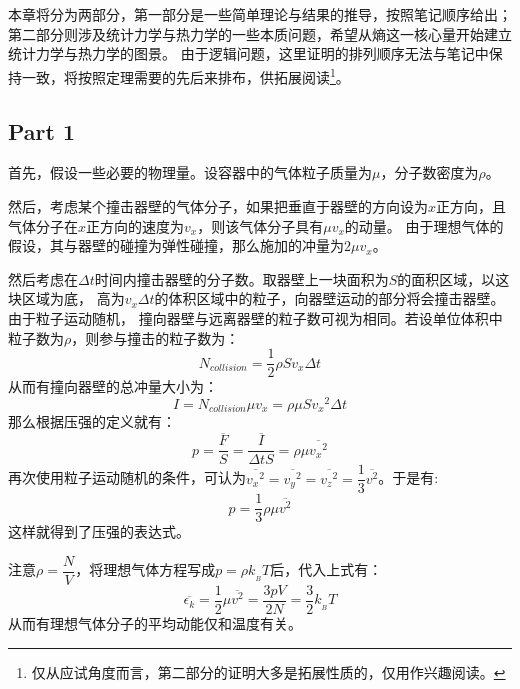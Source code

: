 \chapter[热力学]{}
本章将分为两部分，第一部分是一些简单理论与结果的推导，按照笔记顺序给出；
第二部分则涉及统计力学与热力学的一些本质问题，希望从熵这一核心量开始建立统计力学与热力学的图景。
由于逻辑问题，这里证明的排列顺序无法与笔记中保持一致，将按照定理需要的先后来排布，供拓展阅读\footnote{仅从应试角度而言，第二部分的证明大多是拓展性质的，仅用作兴趣阅读。}。
\section{Part 1}
\begin{prove}
    首先，假设一些必要的物理量。设容器中的气体粒子质量为$\mu$，分子数密度为$\rho$。

    然后，考虑某个撞击器壁的气体分子，如果把垂直于器壁的方向设为$x$正方向，且气体分子在$x$正方向的速度为$v_x$，则该气体分子具有$\mu v_x$的动量。
    由于理想气体的假设，其与器壁的碰撞为弹性碰撞，那么施加的冲量为$2\mu v_x$。

    然后考虑在$\Delta t$时间内撞击器壁的分子数。取器壁上一块面积为$S$的面积区域，以这块区域为底，
    高为$v_x \Delta t$的体积区域中的粒子，向器壁运动的部分将会撞击器壁。由于粒子运动随机，
    撞向器壁与远离器壁的粒子数可视为相同。若设单位体积中粒子数为$\rho$，则参与撞击的粒子数为：
    \begin{equation*}
        N_{collision} = \frac{1}{2} \rho S v_x \Delta t
    \end{equation*}
    从而有撞向器壁的总冲量大小为：
    \begin{equation}
        I = N_{collision} \mu v_x = \rho \mu S v_{x}{}^{2} \Delta t
        \nonumber
    \end{equation}
    那么根据压强的定义就有：
    \begin{equation}
        p = \frac{\overline{F}}{S} = \frac{\overline{I}}{\Delta tS} = \rho \mu \overline{v_{x}{}^{2}}
        \nonumber
    \end{equation}
    再次使用粒子运动随机的条件，可认为$\overline{v_x{}^2}=\overline{v_y{}^2}=\overline{v_z{}^2}=\dfrac{1}{3}\overline{v^2}$。于是有:
    \begin{equation}
        p = \frac{1}{3}\rho \mu \overline{v^{2}}
    \end{equation}
    这样就得到了压强的表达式。

    注意$\rho = \dfrac{N}{V}$，将理想气体方程写成$p = \rho k_{_B}T$后，代入上式有：
    \begin{equation}
        \overline{\epsilon_k} = \frac{1}{2}\mu \overline{v^{2}}  = \frac{3pV}{2N} = \frac{3}{2} k_{_B}T
    \end{equation}
    从而有理想气体分子的平均动能仅和温度有关。
\end{prove}
